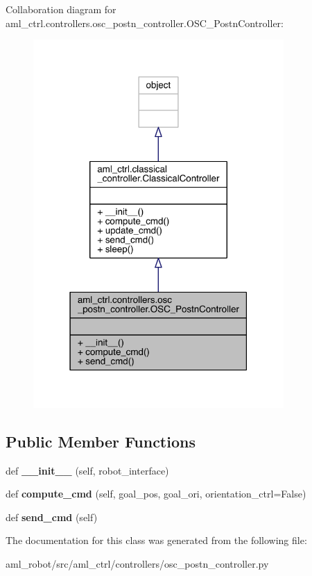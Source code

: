 Collaboration diagram for aml\+\_\+ctrl.\+controllers.\+osc\+\_\+postn\+\_\+controller.\+O\+S\+C\+\_\+\+Postn\+Controller\+:
\nopagebreak
\begin{figure}[H]
\begin{center}
\leavevmode
\includegraphics[width=271pt]{classaml__ctrl_1_1controllers_1_1osc__postn__controller_1_1_o_s_c___postn_controller__coll__graph}
\end{center}
\end{figure}
\subsection*{Public Member Functions}
\begin{DoxyCompactItemize}
\item 
\hypertarget{classaml__ctrl_1_1controllers_1_1osc__postn__controller_1_1_o_s_c___postn_controller_a675e78b93e74ca6703cc5dbaa7bb551b}{}\label{classaml__ctrl_1_1controllers_1_1osc__postn__controller_1_1_o_s_c___postn_controller_a675e78b93e74ca6703cc5dbaa7bb551b} 
def {\bfseries \+\_\+\+\_\+init\+\_\+\+\_\+} (self, robot\+\_\+interface)
\item 
\hypertarget{classaml__ctrl_1_1controllers_1_1osc__postn__controller_1_1_o_s_c___postn_controller_a77b1a1bd3104b8b6da36ca477ce2fef0}{}\label{classaml__ctrl_1_1controllers_1_1osc__postn__controller_1_1_o_s_c___postn_controller_a77b1a1bd3104b8b6da36ca477ce2fef0} 
def {\bfseries compute\+\_\+cmd} (self, goal\+\_\+pos, goal\+\_\+ori, orientation\+\_\+ctrl=False)
\item 
\hypertarget{classaml__ctrl_1_1controllers_1_1osc__postn__controller_1_1_o_s_c___postn_controller_a09312be058926405ac24dbf886889f58}{}\label{classaml__ctrl_1_1controllers_1_1osc__postn__controller_1_1_o_s_c___postn_controller_a09312be058926405ac24dbf886889f58} 
def {\bfseries send\+\_\+cmd} (self)
\end{DoxyCompactItemize}


The documentation for this class was generated from the following file\+:\begin{DoxyCompactItemize}
\item 
aml\+\_\+robot/src/aml\+\_\+ctrl/controllers/osc\+\_\+postn\+\_\+controller.\+py\end{DoxyCompactItemize}

